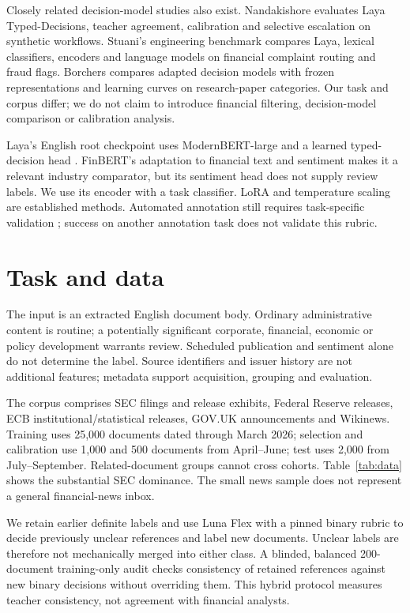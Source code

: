 \documentclass[11pt,a4paper]{article}
\begin{document}
Closely related decision-model studies also exist. Nandakishore
\citep{assessor} evaluates Laya Typed-Decisions, teacher agreement, calibration
and selective escalation on synthetic workflows. Stuani's engineering
benchmark \citep{complaints} compares Laya, lexical classifiers, encoders and
language models on financial complaint routing and fraud flags. Borchers
\citep{borchers} compares adapted decision models with frozen representations
and learning curves on research-paper categories. Our task and corpus differ;
we do not claim to introduce financial filtering, decision-model comparison
or calibration analysis.

Laya's English root checkpoint uses ModernBERT-large and a learned typed-decision
head \citep{laya,modernbert}. FinBERT's adaptation to financial text and sentiment
\citep{finbert} makes it a relevant industry comparator, but its sentiment head
does not supply review labels. We use its encoder with a task classifier.
LoRA \citep{lora} and temperature scaling \citep{guo} are established methods.
Automated annotation still requires task-specific validation \citep{annotation};
success on another annotation task does not validate this rubric.

\section{Task and data}
\label{sec:data}
The input is an extracted English document body. Ordinary administrative content
is routine; a potentially significant corporate, financial, economic or policy
development warrants review. Scheduled publication and sentiment alone do not
determine the label. Source identifiers and issuer history are not additional
features; metadata support acquisition, grouping and evaluation.

The corpus comprises SEC filings and release exhibits, Federal Reserve releases,
ECB institutional/statistical releases, GOV.UK announcements and Wikinews.
Training uses 25,000 documents dated through March 2026; selection and calibration
use 1,000 and 500 documents from April--June; test uses 2,000 from July--September.
Related-document groups cannot cross cohorts. Table~\ref{tab:data} shows the
substantial SEC dominance. The small news sample does not represent a general
financial-news inbox.

We retain earlier definite labels and use Luna Flex with a pinned binary rubric
to decide previously unclear references and label new documents. Unclear labels
are therefore not mechanically merged into either class. A blinded, balanced
200-document training-only audit checks consistency of retained references
against new binary decisions without overriding them. This hybrid protocol
measures teacher consistency, not agreement with financial analysts.
\end{document}
